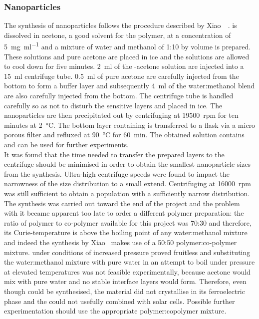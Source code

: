 \subsubsection{\pvtr{} Nanoparticles}
The synthesis of \pvtr{} nanoparticles follows the procedure described by Xiao~\etal{}~\cite{NPsynthesis}. \pvtr{} is dissolved in acetone, a good solvent for the polymer, at a concentration of \SI{5}{\milli\gram\per\milli\litre} and a mixture of water and methanol of 1:10 by volume is prepared. These solutions and pure acetone are placed in ice and the solutions are allowed to cool down for five minutes. \SI{2}{\milli\litre} of the \pvtr{}-acetone solution are injected into a \SI{15}{\milli\litre} centrifuge tube. \SI{0.5}{\milli\litre} of pure acetone are carefully injected from the bottom to form a buffer layer and subsequently \SI{4}{\milli\litre} of the water:methanol blend are also carefully injected from the bottom. The centrifuge tube is handled carefully so as not to disturb the sensitive layers and placed in ice. The nanoparticles are then precipitated out by centrifuging at \SI{19500}{rpm} for ten minutes at \SI{2}{\degreeCelsius}. The bottom layer containing \nps{} is transferred to a flask via a micro porous filter and refluxed at \SI{90}{\degreeCelsius} for \SI{60}{\minute}. The obtained solution contains \pvtr{} \nps{} and can be used for further experiments.\\
It was found that the time needed to transfer the prepared layers to the centrifuge should be minimised in order to obtain the smallest nanoparticle sizes from the synthesis. Ultra-high centrifuge speeds were found to impact the narrowness of the size distribution to a small extend. Centrifuging at \SI{16000}{rpm} was still sufficient to obtain a population with a sufficiently narrow distribution.\\
The synthesis was carried out toward the end of the project and the problem with it became apparent too late to order a different polymer preparation: the ratio of polymer to co-polymer available for this project was 70:30 and therefore, its Curie-temperature is above the boiling point of any water:methanol mixture and indeed the synthesis by Xiao~\etal{} makes use of a 50:50 polymer:co-polymer mixture.  under conditions of increased pressure proved fruitless and substituting the water:methanol mixture with pure water in an attempt to boil under pressure at elevated temperatures was not feasible experimentally, because acetone would mix with pure water and no stable interface layers would form. Therefore, even though \nps{} could be synthesised, the material did not crystallise in its ferroelectric phase and the \nps{} could not usefully combined with solar cells. Possible further experimentation should use the appropriate polymer:copolymer mixture.
